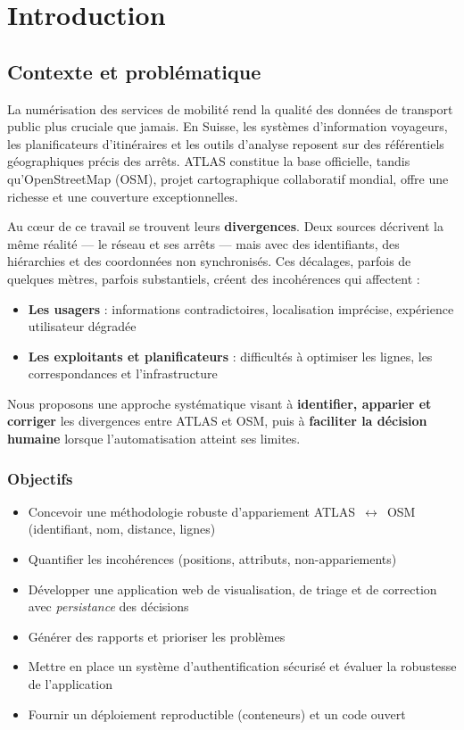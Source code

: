 
\chapter*{Introduction}

\section*{Contexte et problématique}

La numérisation des services de mobilité rend la qualité des données de transport public plus cruciale que jamais. En Suisse, les systèmes d'information voyageurs, les planificateurs d'itinéraires et les outils d'analyse reposent sur des référentiels géographiques précis des arrêts. ATLAS constitue la base officielle, tandis qu'OpenStreetMap (OSM), projet cartographique collaboratif mondial, offre une richesse et une couverture exceptionnelles.

Au cœur de ce travail se trouvent leurs \textbf{divergences}. Deux sources décrivent la même réalité — le réseau et ses arrêts — mais avec des identifiants, des hiérarchies et des coordonnées non synchronisés. Ces décalages, parfois de quelques mètres, parfois substantiels, créent des incohérences qui affectent :

\begin{itemize}
   \item \textbf{Les usagers} : informations contradictoires, localisation imprécise, expérience utilisateur dégradée
   \item \textbf{Les exploitants et planificateurs} : difficultés à optimiser les lignes, les correspondances et l'infrastructure
\end{itemize}

Nous proposons une approche systématique visant à \textbf{identifier, apparier et corriger} les divergences entre ATLAS et OSM, puis à \textbf{faciliter la décision humaine} lorsque l'automatisation atteint ses limites.

\subsection*{Objectifs}

\begin{itemize}
   \item Concevoir une méthodologie robuste d'appariement ATLAS~\(\leftrightarrow\)~OSM (identifiant, nom, distance, lignes)
   \item Quantifier les incohérences (positions, attributs, non-appariements)
   \item Développer une application web de visualisation, de triage et de correction avec \textit{persistance} des décisions
   \item Générer des rapports et prioriser les problèmes
   \item Mettre en place un système d'authentification sécurisé et évaluer la robustesse de l'application
   \item Fournir un déploiement reproductible (conteneurs) et un code ouvert
\end{itemize}

